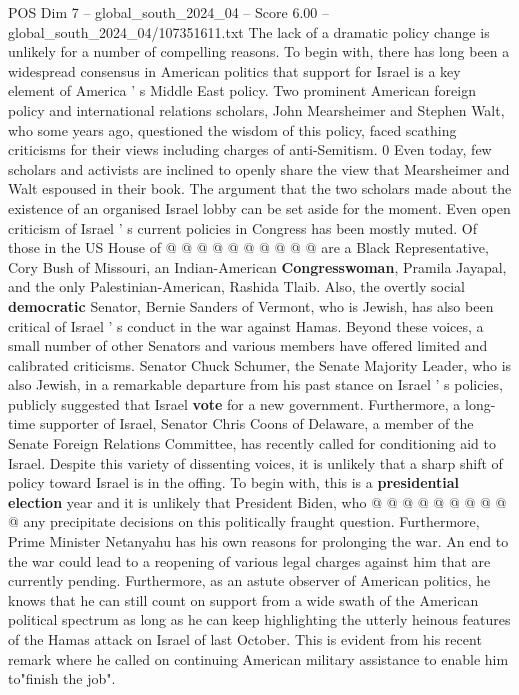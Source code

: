 \begin{textsample}{POS Dim 7 – global\_south\_2024\_04 – Score 6.00 – global\_south\_2024\_04/107351611.txt}
The lack of a dramatic policy change is unlikely for a number of compelling reasons.
To begin with, there has long been a widespread consensus in American politics that support for Israel is a key element of America ' s Middle East policy.
Two prominent American foreign policy and international relations scholars, John Mearsheimer and Stephen Walt, who some years ago, questioned the wisdom of this policy, faced scathing criticisms for their views including charges of anti-Semitism. 0 Even today, few scholars and activists are inclined to openly share the view that Mearsheimer and Walt espoused in their book.
The argument that the two scholars made about the existence of an organised Israel lobby can be set aside for the moment.
Even open criticism of Israel ' s current policies in Congress has been mostly muted.
Of those in the US House of @ @ @ @ @ @ @ @ @ @ are a Black Representative, Cory Bush of Missouri, an Indian-American \textbf{Congresswoman}, Pramila Jayapal, and the only Palestinian-American, Rashida Tlaib.
Also, the overtly social \textbf{democratic} Senator, Bernie Sanders of Vermont, who is Jewish, has also been critical of Israel ' s conduct in the war against Hamas.
Beyond these voices, a small number of other Senators and various members have offered limited and calibrated criticisms.
Senator Chuck Schumer, the Senate Majority Leader, who is also Jewish, in a remarkable departure from his past stance on Israel ' s policies, publicly suggested that Israel \textbf{vote} for a new government.
Furthermore, a long-time supporter of Israel, Senator Chris Coons of Delaware, a member of the Senate Foreign Relations Committee, has recently called for conditioning aid to Israel.
Despite this variety of dissenting voices, it is unlikely that a sharp shift of policy toward Israel is in the offing.
To begin with, this is a \textbf{presidential} \textbf{election} year and it is unlikely that President Biden, who @ @ @ @ @ @ @ @ @ @ any precipitate decisions on this politically fraught question.
Furthermore, Prime Minister Netanyahu has his own reasons for prolonging the war.
An end to the war could lead to a reopening of various legal charges against him that are currently pending.
Furthermore, as an astute observer of American politics, he knows that he can still count on support from a wide swath of the American political spectrum as long as he can keep highlighting the utterly heinous features of the Hamas attack on Israel of last October.
This is evident from his recent remark where he called on continuing American military assistance to enable him to"finish the job".

\end{textsample}
